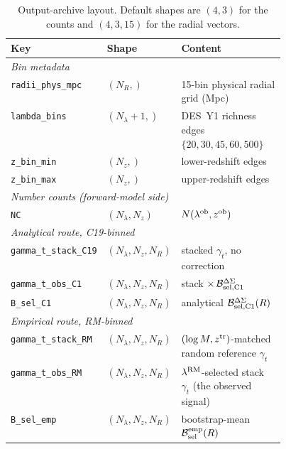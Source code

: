 \documentclass[a4paper, 11pt]{article}
\newcommand{\lob}{\lambda^{\rm ob}}
\newcommand{\lrm}{\lambda^{\rm RM}}
\newcommand{\zob}{z^{\rm ob}}
\newcommand{\ztr}{z^{\rm tr}}
\newcommand{\Bsel}{\mathcal{B}_{\rm sel}}
\newcommand{\Bcal}{\mathcal{B}}
\newcommand{\blk}[1]{\textcolor{datablockcol}{\texttt{#1}}}
\begin{document}
\begin{table}[H]
\centering
\small
\begin{tabular}{@{}l l p{0.45\linewidth}@{}}
\toprule
Key & Shape & Content \\
\midrule
\multicolumn{3}{l}{\textit{Bin metadata}}                                                       \\
\blk{radii\_phys\_mpc}    & $(N_R,)$               & 15-bin physical radial grid (Mpc) \\
\blk{lambda\_bins}        & $(N_\lambda + 1,)$     & DES~Y1 richness edges $\{20, 30, 45, 60, 500\}$ \\
\blk{z\_bin\_min}         & $(N_z,)$               & lower-redshift edges \\
\blk{z\_bin\_max}         & $(N_z,)$               & upper-redshift edges \\
\midrule
\multicolumn{3}{l}{\textit{Number counts (forward-model side)}}                                 \\
\blk{NC}                  & $(N_\lambda, N_z)$     & $N(\lob, \zob)$ \\
\midrule
\multicolumn{3}{l}{\textit{Analytical route, C19-binned}}                                       \\
\blk{gamma\_t\_stack\_C19} & $(N_\lambda, N_z, N_R)$ & stacked $\gamma_t$, no correction \\
\blk{gamma\_t\_obs\_C1}    & $(N_\lambda, N_z, N_R)$ & stack $\times\, \Bcal_{\rm sel,C1}^{\Delta\Sigma}$ \\
\blk{B\_sel\_C1}           & $(N_\lambda, N_z, N_R)$ & analytical $\Bcal_{\rm sel,C1}^{\Delta\Sigma}(R)$ \\
\midrule
\multicolumn{3}{l}{\textit{Empirical route, RM-binned}}                                         \\
\blk{gamma\_t\_stack\_RM}  & $(N_\lambda, N_z, N_R)$ & $(\log M, \ztr)$-matched random reference $\gamma_t$ \\
\blk{gamma\_t\_obs\_RM}    & $(N_\lambda, N_z, N_R)$ & $\lrm$-selected stack $\gamma_t$ (the observed signal) \\
\blk{B\_sel\_emp}          & $(N_\lambda, N_z, N_R)$ & bootstrap-mean $\Bsel^{\rm emp}(R)$ \\
\bottomrule
\end{tabular}
\caption{Output-archive layout. Default shapes are $(4, 3)$ for the
counts and $(4, 3, 15)$ for the radial vectors.}
\label{tab:archive}
\end{table}
\end{document}

